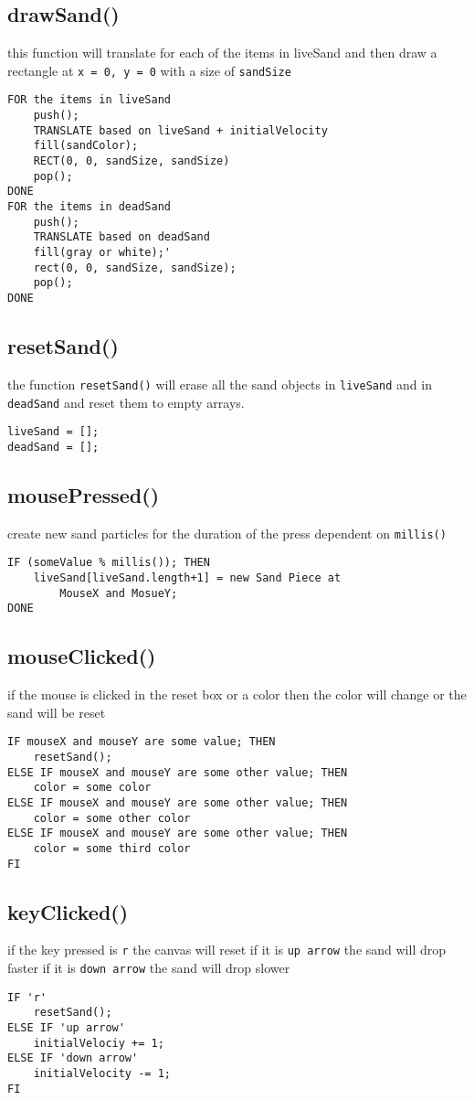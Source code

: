 \documentclass[12 pt]{report}
\begin{document}
\subsection{drawSand()}
this function will translate for each of the items in liveSand and then draw a rectangle at \verb|x = 0, y = 0| with a size of \verb|sandSize|
\begin{verbatim}
FOR the items in liveSand
    push();
    TRANSLATE based on liveSand + initialVelocity
    fill(sandColor);
    RECT(0, 0, sandSize, sandSize)
    pop();
DONE
FOR the items in deadSand
    push();
    TRANSLATE based on deadSand
    fill(gray or white);'
    rect(0, 0, sandSize, sandSize);
    pop();
DONE
\end{verbatim}

\subsection{resetSand()}
the function \verb|resetSand()| will erase all the sand objects in \verb|liveSand| and in \verb|deadSand| and reset them to empty arrays.
\begin{verbatim}
liveSand = [];
deadSand = [];
\end{verbatim}

\subsection{mousePressed()} 
create new sand particles for the duration of the press dependent on \verb|millis()|
\begin{verbatim}
IF (someValue % millis()); THEN
    liveSand[liveSand.length+1] = new Sand Piece at 
        MouseX and MosueY;
DONE
\end{verbatim}

\subsection{mouseClicked()}
if the mouse is clicked in the reset box or a color then the color will change or the sand will be reset
\begin{verbatim}
IF mouseX and mouseY are some value; THEN
    resetSand();
ELSE IF mouseX and mouseY are some other value; THEN
    color = some color
ELSE IF mouseX and mouseY are some other value; THEN
    color = some other color
ELSE IF mouseX and mouseY are some other value; THEN
    color = some third color
FI
\end{verbatim}

\subsection{keyClicked()} 
if the key pressed is \verb|r| the canvas will reset if it is \verb|up arrow| the sand will drop faster if it is \verb|down arrow| the sand will drop slower
\begin{verbatim}
IF 'r'
    resetSand();
ELSE IF 'up arrow'
    initialVelociy += 1;
ELSE IF 'down arrow'
    initialVelocity -= 1;
FI
\end{verbatim}
\end{document}
